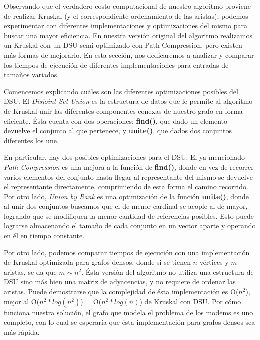 Observando que el verdadero costo computacional de nuestro algoritmo proviene de realizar Kruskal (y el correspondiente ordenamiento de las aristas), podemos experimentar con diferentes implementaciones y optimizaciones del mismo para buscar una mayor eficiencia. En nuestra versión original del algoritmo realizamos un Kruskal con un DSU semi-optimizado con Path Compression, pero existen más formas de mejorarlo. En esta sección, nos dedicaremos a analizar y comparar los tiempos de ejecución de diferentes implementaciones para entradas de tamaños variados.

\vspace{1em}
Comencemos explicando cuáles son las diferentes optimizaciones posibles del DSU. El \textit{Disjoint Set Union} es la estructura de datos que le permite al algoritmo de Kruskal unir las diferentes componentes conexas de nuestro grafo en forma eficiente. Ésta cuenta con dos operaciones: \textbf{find()}, que dado un elemento devuelve el conjunto al que pertenece, y \textbf{unite()}, que dados dos conjuntos diferentes los une. 

\vspace{1em}
En particular, hay dos posibles optimizaciones para el DSU. El ya mencionado \textit{Path Compression} es una mejora a la función de \textbf{find()}, donde en vez de recorrer varios elementos del conjunto hasta llegar al representante del mismo se devuelve el representante directamente, comprimiendo de esta forma el camino recorrido. Por otro lado, \textit{Union by Rank} es una optimización de la función \textbf{unite()}, donde al unir dos conjuntos buscamos que el de menor cardinal se acople al de mayor, logrando que se modifiquen la menor cantidad de referencias posibles. Esto puede lograrse almacenando el tamaño de cada conjunto en un vector aparte y operando en él en tiempo constante.

\vspace{1em}
Por otro lado, podemos comparar tiempos de ejecución con una implementación de Kruskal optimizada para grafos densos, donde si se tienen $n$ vértices y $m$ aristas, se da que $m \sim n^2$. Ésta versión del algoritmo no utiliza una estructura de DSU sino más bien una matriz de adyacencias, y no requiere de ordenar las aristas. Puede demostrarse que la complejidad de ésta implementación es O($n^2$), mejor al O($n^2 * log(n^2)$) = O($n^2 * log(n)$) de Kruskal con DSU. Por cómo funciona nuestra solución, el grafo que modela el problema de los modems es uno completo, con lo cual se esperaría que ésta implementación para grafos densos sea más rápida.

